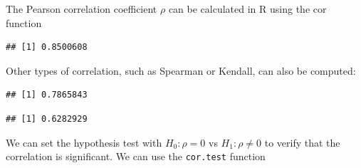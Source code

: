 \documentclass[
]{article}
\newenvironment{Shaded}{\begin{snugshade}}{\end{snugshade}}
\newcommand{\AttributeTok}[1]{\textcolor[rgb]{0.13,0.29,0.53}{#1}}
\newcommand{\FunctionTok}[1]{\textcolor[rgb]{0.13,0.29,0.53}{\textbf{#1}}}
\newcommand{\NormalTok}[1]{#1}
\newcommand{\SpecialCharTok}[1]{\textcolor[rgb]{0.81,0.36,0.00}{\textbf{#1}}}
\newcommand{\StringTok}[1]{\textcolor[rgb]{0.31,0.60,0.02}{#1}}
\begin{document}
The Pearson correlation coefficient \(\rho\) can be calculated in R
using the cor function

\begin{Shaded}
\end{Shaded}

\begin{verbatim}
## [1] 0.8500608
\end{verbatim}

Other types of correlation, such as Spearman or Kendall, can also be
computed:

\begin{Shaded}
\end{Shaded}

\begin{verbatim}
## [1] 0.7865843
\end{verbatim}

\begin{Shaded}
\end{Shaded}

\begin{verbatim}
## [1] 0.6282929
\end{verbatim}

We can set the hypothesis test with \(H_0: \rho = 0\) vs
\(H_1: \rho \not= 0\) to verify that the correlation is significant. We
can use the \texttt{cor.test} function

\begin{Shaded}
\end{Shaded}
\end{document}
